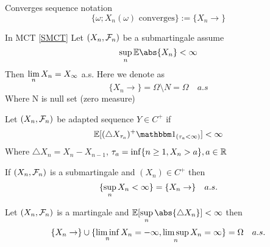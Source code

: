 \begin{dfn} Converges sequence notation
\begin{equation*}
    \{\omega; X_n(\omega) \text{ converges}\} := \{X_n \rightarrow\}
\end{equation*}
\end{dfn}
\begin{example}
In MCT \ref{SMCT} Let $(X_n, \mathcal{F}_n)$ be a submartingale assume
\begin{equation*}
    \sup\limits_n \E\abs{X_n} < \infty
\end{equation*}
Then $\lim\limits_{n} X_n = X_\infty$ a.s. Here we denote as 
\begin{equation*}
    \{X_n \rightarrow\} = \Omega\setminus N = \Omega \quad a.s
\end{equation*}Where N is null set (zero measure)
\end{example}

\begin{dfn}
Let $(X_n, \mathcal{F}_n)$ be adapted sequence $Y\in C^+$ if
\begin{equation*}
    \E[(\triangle X_{\tau_a})^+ \I_{(\tau_a < \infty)}] < \infty
\end{equation*}Where $\triangle X_n = X_n - X_{n-1}$, $\tau_a = \inf\{n\geq 1, X_n >a\} ,a\in \mathbb{R}$
\end{dfn}

\newpage
\begin{thm}
If $(X_n, \mathcal{F}_n)$ is a submartingale and $(X_n) \in C^+$ then 
\begin{equation*}
    \{\sup\limits_{n} X_n < \infty\} = \{X_n \rightarrow\} \quad a.s.
\end{equation*}
\end{thm}
\begin{cor}
    Let $(X_n, \mathcal{F}_n)$ is a martingale and $\E[\supunder{n} \abs{\triangle X_n}] < \infty$ then 
    \begin{equation*}
        \{X_n \rightarrow\} \cup \{\liminf\limits_{n} X_n = -\infty, \limsup\limits_{n} X_n = \infty\} = \Omega \quad a.s.
    \end{equation*}
\end{cor}
\pf

\newpage

